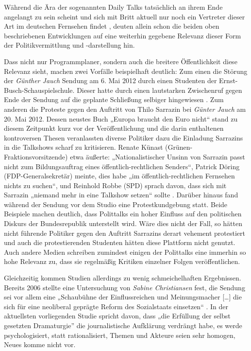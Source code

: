 Während die Ära der sogenannten Daily Talks tatsächlich an ihrem Ende angelangt zu sein scheint und sich mit Britt aktuell nur noch ein Vertreter dieser Art im deutschen Fernsehen findet \parencite{niggemeierEndeDailyTalkAra2009}, deuten allein schon die beiden oben beschriebenen Entwicklungen auf eine weiterhin gegebene Relevanz dieser Form der Politikvermittlung und -darstellung hin.

Dass nicht nur Programmplaner, sondern auch die breitere Öffentlichkeit diese Relevanz sieht, machen zwei Vorfälle beispielhaft deutlich: Zum einen die Störung der \textit{Günther Jauch} Sendung am 6. Mai 2012 durch einen Studenten der Ernst-Busch-Schauspielschule. Dieser hatte durch einen lautstarken Zwischenruf gegen Ende der Sendung auf die geplante Schließung selbiger hingewiesen \parencite{brucknerStudiogastSorgtFuer2012}. Zum anderen die Proteste gegen den Auftritt von Thilo Sarrazin bei \textit{Günter Jauch} am 20. Mai 2012. Dessen neustes Buch „Europa braucht den Euro nicht“ stand zu diesem Zeitpunkt kurz vor der Veröffentlichung und die darin enthaltenen kontroversen Thesen veranlassten diverse Politiker dazu die Einladung Sarrazins in die Talkshows scharf zu kritisieren. Renate Künast (Grünen-Fraktionsvorsitzende) etwa äußerte: „Nationalistischer Unsinn von Sarrazin passt nicht zum Bildungsauftrag eines öffentlich-rechtlichen Senders“, Patrick Döring (FDP-Generalsekretär) meinte, dies habe „im öffentlich-rechtlichen Fernsehen nichts zu suchen“, und Reinhold Robbe (SPD) sprach davon, dass sich mit Sarrazin „niemand mehr in eine Talkshow setzen“ sollte \cite{hansRittAufEmpoerungswelle2012}. Darüber hinaus fand während der Sendung vor dem Studio eine Protestkundgebung statt. Beide Beispiele machen deutlich, dass Polittalks ein hoher Einfluss auf den politischen Diskurs der Bundesrepublik unterstellt wird. Wäre dies nicht der Fall, so hätten nicht führende Politiker gegen den Auftritt Sarrazins derart vehement protestiert und auch die protestierenden Studenten hätten diese Plattform nicht genutzt. Auch andere Medien schreiben zumindest einigen der Polittalks eine immerhin so hohe Relevanz zu, dass sie regelmäßig Kritiken einzelner Folgen veröffentlichen.

Gleichzeitig kommen Studien allerdings zu wenig schmeichelhaften Ergebnissen. Bereits 2006 stellte eine Untersuchung von \textit{Sabine Christiansen} fest, die Sendung sei vor allem eine „Schaubühne der Einflussreichen und Meinungsmacher [\ldots] die sich für eine neoliberal geprägte Reform des Sozialstaats einsetzen“ \parencite[17]{muellerSchaubuehneFuerEinflussreichen2006}. In der aktuellsten vorliegenden Studie spricht \textcite{gaeblerUndUnserenTaeglichen2011}  davon, dass „die Erfüllung der selbst gesetzten Dramaturgie” \parencite[112]{gaeblerUndUnserenTaeglichen2011} die journalistische Aufklärung verdrängt habe, es werde psychologisiert, statt rationalisiert, Themen und Akteure seien sehr homogen, Neues komme nicht vor.

